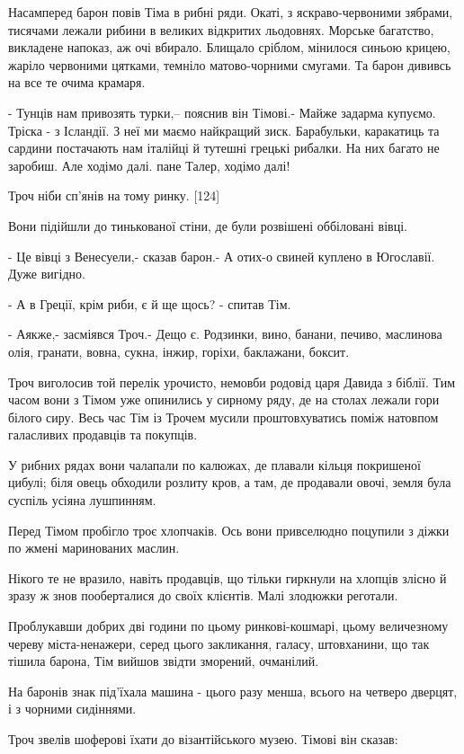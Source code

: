 Насамперед барон повів Тіма в рибні ряди. Окаті, з яскраво-червоними зябрами, тисячами лежали рибини в великих відкритих льодовнях. Морське багатство, викладене напоказ, аж очі вбирало. Блищало сріблом, мінилося синьою крицею, жаріло червоними цятками, темніло матово-чорними смугами. Та барон дививсь на все те очима крамаря.

- Тунців нам привозять турки,-- пояснив він Тімові.- Майже задарма купуємо. Тріска - з Ісландії. З неї ми маємо найкращий зиск. Барабульки, каракатиць та сардини постачають нам італійці й тутешні грецькі рибалки. На них багато не заробиш. Але ходімо далі. пане Талер, ходімо далі!

Троч ніби сп'янів на тому ринку. [124]

Вони підійшли до тинькованої стіни, де були розвішені оббіловані вівці.

- Це вівці з Венесуели,- сказав барон.- А отих-о свиней куплено в Югославії. Дуже вигідно.

- А в Греції, крім риби, є й ще щось? - спитав Тім.

- Аякже,- засміявся Троч.- Дещо є. Родзинки, вино, банани, печиво, маслинова олія, гранати, вовна, сукна, інжир, горіхи, баклажани, боксит.

Троч виголосив той перелік урочисто, немовби родовід царя Давида з біблії. Тим часом вони з Тімом уже опинились у сирному ряду, де на столах лежали гори білого сиру. Весь час Тім із Трочем мусили проштовхуватись поміж натовпом галасливих продавців та покупців.

У рибних рядах вони чалапали по калюжах, де плавали кільця покришеної цибулі; біля овець обходили розлиту кров, а там, де продавали овочі, земля була суспіль усіяна лушпинням.

Перед Тімом пробігло троє хлопчаків. Ось вони привселюдно поцупили з діжки по жмені маринованих маслин.

Нікого те не вразило, навіть продавців, що тільки гиркнули на хлопців злісно й зразу ж знов пооберталися до своїх клієнтів. Малі злодюжки реготали.

Проблукавши добрих дві години по цьому ринкові-кошмарі, цьому величезному череву міста-ненажери, серед цього закликання, галасу, штовханини, що так тішила барона, Тім вийшов звідти зморений, очманілий.

На баронів знак під'їхала машина - цього разу менша, всього на четверо дверцят, і з чорними сидіннями.

Троч звелів шоферові їхати до візантійського музею. Тімові він сказав:

